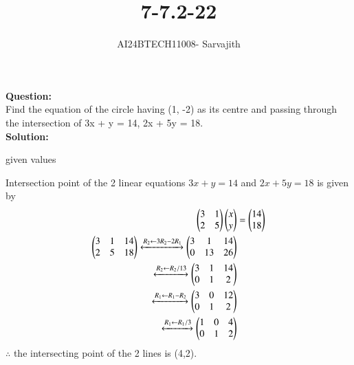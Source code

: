 \documentclass[journal]{IEEEtran}
\begin{document}

\vspace{3cm}

\title{7-7.2-22}
\author{AI24BTECH11008- Sarvajith
}
{\let\newpage\relax\maketitle}

\renewcommand{\thefigure}{\theenumi}
\renewcommand{\thetable}{\theenumi}
\setlength{\intextsep}{10pt} %
\renewcommand{\thetable}{\theenumi}
\textbf{Question: }\\
Find the equation of the circle having (1, -2) as its centre and passing through the
intersection of 3x + y = 14, 2x + 5y = 18.\\
\textbf{Solution: }\\
\renewcommand{\tablename}{TABLE 1}
\begin{table}[h!]    
\centering
 
\caption{given values}
 \label{tab1-7-7.2-22-1}
\end{table}
Intersection point of the 2 linear equations $3x + y = 14$ and $2x + 5y = 18$ is given by\\
\begin{align*}
\begin{pmatrix}3 & 1\\2 & 5\end{pmatrix}\begin{pmatrix}x \\ y\end{pmatrix} &= \begin{pmatrix}14\\18\end{pmatrix}\\
\begin{pmatrix}3 & 1 & 14\\2 & 5 & 18\end{pmatrix}\xleftrightarrow[]{R_2 \leftarrow {3R_2-2R_1}}\begin{pmatrix}3 & 1 & 14\\0 & 13 & 26\end{pmatrix}\\
\xleftrightarrow[]{R_2 \leftarrow {R_2/13}}\begin{pmatrix}3 & 1 & 14\\0 & 1 & 2\end{pmatrix}\\
\xleftrightarrow[]{R_1 \leftarrow {R_1-R_2}}\begin{pmatrix}3 & 0 & 12 \\0 & 1 & 2\end{pmatrix}\\
\xleftrightarrow[]{R_1 \leftarrow {R_1/3}}\begin{pmatrix}1& 0 & 4\\0 & 1 & 2\end{pmatrix}\\
\end{align*}
$\therefore$ the intersecting point of the 2 lines is (4,2).\\
\end{document}
